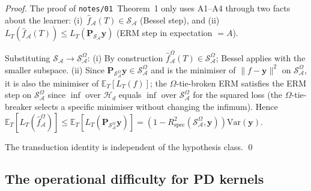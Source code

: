 \documentclass[11pt,a4paper]{article}
\theoremstyle{plain}
\theoremstyle{definition}
\theoremstyle{remark}
\newcommand{\by}{\mathbf{y}}
\newcommand{\bP}{\mathbf{P}}
\newcommand{\E}{\mathbb{E}}
\newcommand{\Var}{\mathrm{Var}}
\newcommand{\Rspec}{R^2_{\mathrm{spec}}}
\newcommand{\Scal}{\mathcal{S}}
\newcommand{\Acal}{\mathcal{A}}
\newcommand{\Hcal}{\mathcal{H}}
\begin{document}
\begin{proof}
The proof of \texttt{notes/01}~Theorem~1 only uses A1--A4 through
two facts about the learner:
(i)~$\hat f_\Acal(T) \in \Scal_\Acal$ (Bessel step), and
(ii)~$L_T(\hat f_\Acal(T)) \le L_T(\bP_{\Scal_\Acal}\by)$
(ERM step in expectation $= A$).

Substituting $\Scal_\Acal \to \Scal_\Acal^\Omega$:
(i) By construction $\hat f_\Acal^\Omega(T) \in \Scal_\Acal^\Omega$;
Bessel applies with the smaller subspace.
(ii) Since $\bP_{\Scal_\Acal^\Omega}\by \in \Scal_\Acal^\Omega$ and is
the minimiser of $\|f - \by\|^2$ on $\Scal_\Acal^\Omega$, it is also
the minimiser of $\E_T[L_T(f)]$; the $\Omega$-tie-broken ERM
satisfies the ERM step on $\Scal_\Acal^\Omega$ since $\inf$ over
$\Hcal_d$ equals $\inf$ over $\Scal_\Acal^\Omega$ for the squared
loss (the $\Omega$-tie-breaker selects a specific minimiser without
changing the infimum). Hence $\E_T[L_T(\hat f_\Acal^\Omega)] \le
\E_T[L_T(\bP_{\Scal_\Acal^\Omega}\by)] = (1 - \Rspec(\Scal_\Acal^\Omega, \by))\Var(\by)$.

The transduction identity is independent of the hypothesis class.
\qed
\end{proof}

\subsection{The operational difficulty for PD kernels}
\end{document}
